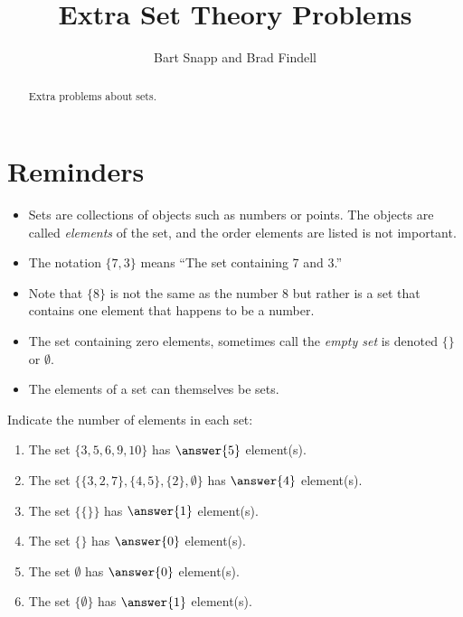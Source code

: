 \documentclass[nooutcomes]{ximera}
\title{Extra Set Theory Problems}
\author{Bart Snapp and Brad Findell}
\begin{document}
\begin{abstract}
Extra problems about sets. 
\end{abstract}
\maketitle

\section{Reminders}
\begin{itemize}
\item Sets are collections of objects such as numbers or points.  The objects are called \emph{elements} of the set, and the order elements are listed is not important.  

\item The notation $\{7, 3\}$ means ``The set containing 7 and 3.''  

\item Note that $\{8\}$ is not the same as the number 8 but rather is a set that contains one element that happens to be a number. 

\item The set containing zero elements, sometimes call the \emph{empty set} is denoted $\{\}$ or $\emptyset$.  

\item The elements of a set can themselves be sets.  

\end{itemize}


\begin{problem}
Indicate the number of elements in each set: 
\begin{enumerate}
\item The set $\{3, 5, 6, 9, 10\}$ has $\answer{5}$ element(s).
\item The set $\{ \{3,2,7\}, \{4,5\}, \{2\}, \emptyset \}$ has $\answer{4}$ element(s).
\item The set $\{ \{ \} \}$ has $\answer{1}$ element(s).
\item The set $\{\}$ has $\answer{0}$ element(s).
\item The set $\emptyset$ has $\answer{0}$ element(s).
\item The set $\{ \emptyset \}$ has $\answer{1}$ element(s).
\end{enumerate}

\end{problem}
\end{document}
